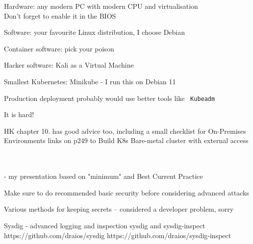 \documentclass[Screen16to9,17pt]{foils}
\begin{document}
\begin{list2}
\item Hardware: any modern PC with modern CPU and virtualisation\\
Don't forget to enable it in the BIOS
\item Software: your favourite Linux distribution, I choose Debian
\item Container software: pick your poison
\item Hacker software: Kali as a Virtual Machine 
\item Smallest Kubernetes: Minikube -  I run this on Debian 11
\item Production deployment probably would use better tools like \faWrench\ \verb+Kubeadm+
\end{list2}





\begin{list2}
\item It is hard!


\item HK chapter 10. has good advice too, including a small checklist for On-Premises Environments
links on p249 to Build K8s Bare-metal cluster with external access\\
\\
\\
\end{list2}


\myquestionspage


- my presentation based on "minimum" and Best Current Practice

Make sure to do recommended basic security before considering advanced attacks

Various methods for keeping secrets -- considered a developer problem, sorry


Sysdig - advanced logging and inspection
sysdig and sysdig-inspect
https://github.com/draios/sysdig
https://github.com/draios/sysdig-inspect
\end{document}
